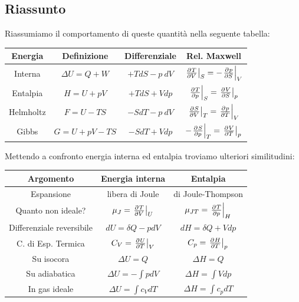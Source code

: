 \subsection{Riassunto}
Riassumiamo il comportamento di queste quantit\`a nella seguente tabella:
\begin{center}
\begin{tabular}{|c||c|c|c|}
\hline
Energia & Definizione &Differenziale & Rel. Maxwell\\\hline
Interna & $\Delta U=Q+W$ & $+TdS-p\ dV$ & $\ppb VTS=-\ppb SpV$\\
Entalpia & $H=U+pV$ & $+TdS+Vdp$ & $\ppb pTS=\ppb SVp$\\
Helmholtz & $F=U-TS$ & $-SdT-p\ dV$ & $\ppb VST=\ppb TpV$\\
Gibbs & $G=U+pV-TS$ & $-SdT+Vdp$ & $-\ppb pST=\ppb TVp$\\\hline
\end{tabular}
\end{center}
Mettendo a confronto energia interna ed entalpia troviamo ulteriori similitudini:
\begingroup
\renewcommand{\arraystretch}{1.5}
\begin{center}
\begin{tabular}{|c||c||c|}
\hline
Argomento & Energia interna & Entalpia\\\hline\hline
Espansione & libera di Joule & di Joule-Thompson\\\hline
Quanto non ideale?& $\mu_J=\ppb VTU$ & $\mu_{JT}=\ppb pTH$\\\hline
Differenziale reversibile &$dU=\delta Q-pdV$ & $dH =\delta Q+Vdp$\\\hline
C. di Esp. Termica&$C_V=\ppb TUV$ & $C_p=\ppb THp$\\\hline
Su isocora & $\Delta U=Q$ & $\Delta H=Q$\\\hline
Su adiabatica & $\Delta U=-\int pdV$ &  $\Delta H=\int Vdp$\\\hline
In gas ideale & $\Delta U=\int c_VdT$ & $\Delta H=\int c_pdT$\\\hline
\end{tabular}
\end{center}
\endgroup

